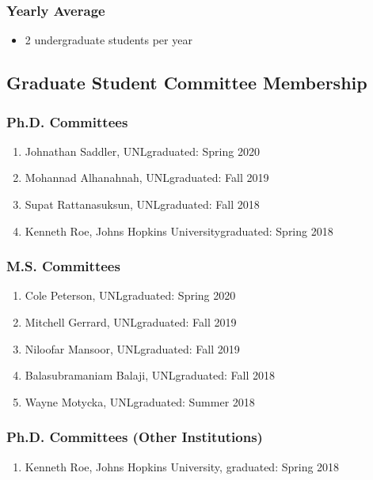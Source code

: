 \documentclass[10pt]{article}
\begin{document}
{  \subsubsection{Yearly Average}
  \begin{itemize}
  \item 2 undergraduate students per year  %
  \end{itemize}


  \subsection{Graduate Student Committee Membership}
  \subsubsection{Ph.D. Committees}
  \begin{enumerate}
  \item Johnathan Saddler, UNL\hfill graduated: Spring 2020
  \item Mohannad Alhanahnah, UNL\hfill graduated: Fall 2019
  \item Supat Rattanasuksun, UNL\hfill graduated: Fall 2018
  \item Kenneth Roe,  Johns Hopkins University\hfill graduated: Spring 2018
  \end{enumerate}

  \subsubsection{M.S. Committees}
  \begin{enumerate}
  \item Cole Peterson, UNL\hfill graduated: Spring 2020
  \item Mitchell Gerrard, UNL\hfill graduated: Fall 2019
  \item Niloofar Mansoor, UNL\hfill graduated: Fall 2019
  \item Balasubramaniam Balaji, UNL\hfill graduated: Fall 2018
  \item Wayne Motycka, UNL\hfill graduated: Summer 2018
  \end{enumerate}


  \subsubsection{Ph.D. Committees (Other Institutions)}
  \begin{enumerate}
  \item Kenneth Roe,  Johns Hopkins University,  graduated: Spring 2018
  \end{enumerate}

}
\end{document}
